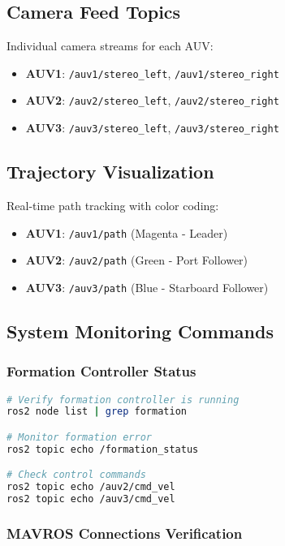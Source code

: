 \documentclass[11pt,a4paper]{article}
\begin{document}
\subsection{Camera Feed Topics}

Individual camera streams for each AUV:
\begin{itemize}
    \item \textbf{AUV1}: \texttt{/auv1/stereo\_left}, \texttt{/auv1/stereo\_right}
    \item \textbf{AUV2}: \texttt{/auv2/stereo\_left}, \texttt{/auv2/stereo\_right}
    \item \textbf{AUV3}: \texttt{/auv3/stereo\_left}, \texttt{/auv3/stereo\_right}
\end{itemize}

\subsection{Trajectory Visualization}

Real-time path tracking with color coding:
\begin{itemize}
    \item \textbf{AUV1}: \texttt{/auv1/path} (Magenta - Leader)
    \item \textbf{AUV2}: \texttt{/auv2/path} (Green - Port Follower)
    \item \textbf{AUV3}: \texttt{/auv3/path} (Blue - Starboard Follower)
\end{itemize}

\subsection{System Monitoring Commands}

\subsubsection{Formation Controller Status}

\begin{lstlisting}[language=bash, caption=Formation System Monitoring]
# Verify formation controller is running
ros2 node list | grep formation

# Monitor formation error
ros2 topic echo /formation_status

# Check control commands
ros2 topic echo /auv2/cmd_vel
ros2 topic echo /auv3/cmd_vel
\end{lstlisting}

\subsubsection{MAVROS Connections Verification}
\end{document}
